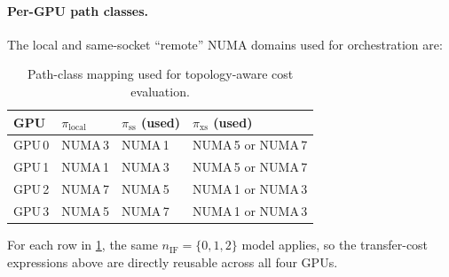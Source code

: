 \paragraph{Per-GPU path classes.}
The local and same-socket ``remote'' NUMA domains used for orchestration are:
\begin{table}[H]
  \centering
  \small
  \begin{tabular}{l l l l}
    \toprule
    GPU & $\pi_{\mathrm{local}}$ & $\pi_{\mathrm{ss}}$ (used) & $\pi_{\mathrm{xs}}$ (used) \\
    \midrule
    GPU\,0 & NUMA\,3 & NUMA\,1 & NUMA\,5 or NUMA\,7 \\
    GPU\,1 & NUMA\,1 & NUMA\,3 & NUMA\,5 or NUMA\,7 \\
    GPU\,2 & NUMA\,7 & NUMA\,5 & NUMA\,1 or NUMA\,3 \\
    GPU\,3 & NUMA\,5 & NUMA\,7 & NUMA\,1 or NUMA\,3 \\
    \bottomrule
  \end{tabular}
  \caption{Path-class mapping used for topology-aware cost evaluation.}
  \label{tab:gpu-path-class-mapping}
\end{table}

For each row in \cref{tab:gpu-path-class-mapping}, the same
$n_{\mathrm{IF}}=\{0,1,2\}$ model applies, so the transfer-cost expressions
above are directly reusable across all four GPUs.
